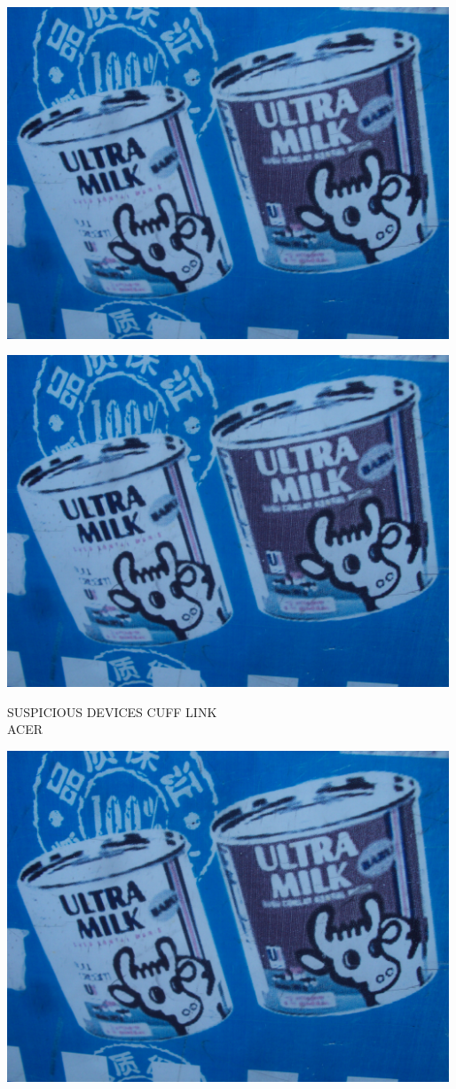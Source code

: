 \documentclass[10pt,letterpaper]{article}
\begin{document}
\includegraphics[width=5.19in]{landscape.jpg}

\vspace{0.25in}
\includegraphics[width=5.19in]{landscape.jpg}

SUSPICIOUS DEVICES CUFF LINK\\
ACER\\
\pagebreak

\includegraphics[width=5.19in]{landscape.jpg}
\end{document}
